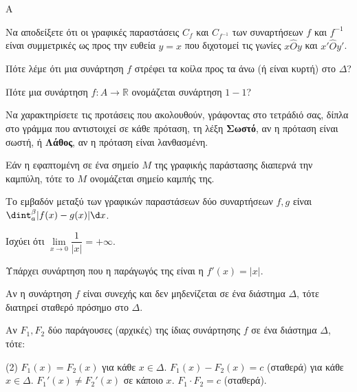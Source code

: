 \begin{thema}{A}
\begin{erwthma}
    \item Να αποδείξετε ότι οι γραφικές παραστάσεις $ C_f $ και $ C_{f^{-1}} $ των συναρτήσεων $ f $ και $ f^{-1} $ είναι συμμετρικές ως προς την ευθεία $ y=x $ που διχοτομεί τις γωνίες $ x\hat{O}y $ και $ x'\hat{O}y' $.
    \item Πότε λέμε ότι μια συνάρτηση $f$ στρέφει τα κοίλα προς τα άνω (ή είναι κυρτή) στο $\Delta$?
    \item Πότε μια συνάρτηση $f:A\to\mathbb{R}$ ονομάζεται συνάρτηση $1-1$?
    \item Να χαρακτηρίσετε τις προτάσεις που ακολουθούν, γράφοντας στο τετράδιό σας, δίπλα στο γράμμα που αντιστοιχεί σε κάθε πρόταση, τη λέξη \textbf{Σωστό}, αν η πρόταση είναι σωστή, ή \textbf{Λάθος}, αν η πρόταση είναι λανθασμένη.
    \begin{alist}
        \item Εάν η εφαπτομένη σε ένα σημείο $M$ της γραφικής παράστασης διαπερνά την καμπύλη, τότε το $M$ ονομάζεται σημείο καμπής της.
        \item Το εμβαδόν μεταξύ των γραφικών παραστάσεων δύο συναρτήσεων $f,g$ είναι $\dint_a^\beta |f(x) - g(x)| \d x$.
        \item Ισχύει ότι $\lim\limits_{x \to 0} \dfrac{1}{|x|} = +\infty$.
        \item Υπάρχει συνάρτηση που η παράγωγός της είναι η $f'(x) = |x|$.
        \item Αν η συνάρτηση $f$ είναι συνεχής και δεν μηδενίζεται σε ένα διάστημα $\Delta$, τότε διατηρεί σταθερό πρόσημο στο $\Delta$.
    \end{alist}
    \item Αν $F_1, F_2$ δύο παράγουσες (αρχικές) της ίδιας συνάρτησης $f$ σε ένα διάστημα $\Delta$, τότε:
    \begin{tasks}[label=\let\textdexiakeraia\relax\alph*.](2)
        \task $F_1(x) = F_2(x)$ για κάθε $x \in \Delta$.
        \task $F_1(x) - F_2(x) = c$ (σταθερά) για κάθε $x \in \Delta$.
        \task $F_1'(x) \ne F_2'(x)$ σε κάποιο $x$.
        \task $F_1 \cdot F_2 = c$ (σταθερά).
    \end{tasks}
\end{erwthma}
\end{thema}



